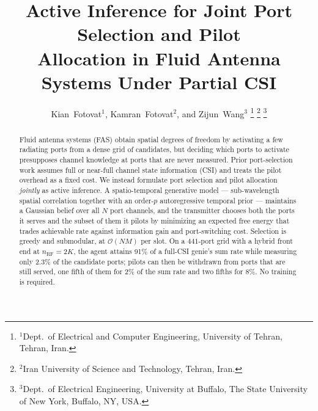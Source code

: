 \documentclass[journal]{IEEEtran}
\begin{document}
\title{Active Inference for Joint Port Selection and Pilot\\
       Allocation in Fluid Antenna Systems Under Partial CSI}

\author{Kian~Fotovat$^{1}$, Kamran~Fotovat$^{2}$, and Zijun~Wang$^{3}$%
  \thanks{$^{1}$Dept.\ of Electrical and Computer Engineering, University of
  Tehran, Tehran, Iran.}%
  \thanks{$^{2}$Iran University of Science and Technology, Tehran, Iran.}%
  \thanks{$^{3}$Dept.\ of Electrical Engineering, University at Buffalo, The
  State University of New York, Buffalo, NY, USA.}%
}

\maketitle

\begin{abstract}
Fluid antenna systems (FAS) obtain spatial degrees of freedom by activating a
few radiating ports from a dense grid of candidates, but deciding which ports
to activate presupposes channel knowledge at ports that are never measured.
Prior port-selection work assumes full or near-full channel state information
(CSI) and treats the pilot overhead as a fixed cost. We instead formulate port
selection and pilot allocation \emph{jointly} as active inference. A
spatio-temporal generative model --- sub-wavelength spatial correlation
together with an order-$p$ autoregressive temporal prior --- maintains a
Gaussian belief over all $N$ port channels, and the transmitter chooses both
the ports it serves and the subset of them it pilots by minimizing an expected
free energy that trades achievable rate against information gain and
port-switching cost. Selection is greedy and submodular, at $\mathcal{O}(NM)$
per slot. On a $441$-port grid with a hybrid front end at
$n_{\mathrm{RF}}=2K$, the agent attains 91\% of a full-CSI genie's sum rate
while measuring only 2.3\% of the candidate ports; pilots can then be withdrawn
from ports that are still served, one fifth of them for 2\% of the sum rate and
two fifths for 8\%. No training is required.
\end{abstract}
\end{document}
